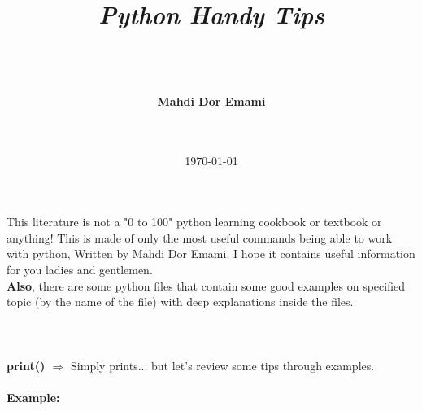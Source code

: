 \documentclass[a4paper,18pt]{article}
\begin{document}
\title{\textsl{\textbf{\fontsize{40}{50}\selectfont Python Handy Tips\\}}}
\author{\\\\\\ \textrm{\textbf{\Large Mahdi Dor Emami}}\\\\\\}
\date{\today}
\maketitle


\newpage
\tableofcontents
\newpage
{}

\section{\colorbox {Abi}{}}
This literature is not a "0 to 100" python learning cookbook or textbook or anything! This is made of only the most useful commands being able to work with python, Written by Mahdi Dor Emami. I hope it contains useful information for you ladies and gentlemen.\\

\textbf{Also}, there are some python files that contain some good examples on specified topic (by the name of the file) with deep explanations inside the files.\\\\


\newpage

\section{\colorbox {Abi}{}}
\subsection{\colorbox {matgreen}{\color{white}{\large print command tips}}}
\textbf{print() $\Rightarrow$} Simply prints... but let's review some tips through examples.\\\\
\textbf{Example:\\}
\end{document}
